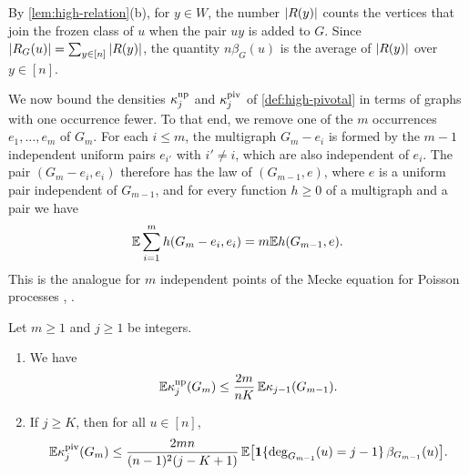 By \cref{lem:high-relation}(b), for $y \in W$, the number $\left|R(y)\right|$ counts the vertices that join the frozen class of $u$ when the pair $uy$ is added to $G$. Since $\left|R_G(u)\right| = \sum_{y \in [n]} \left|R(y)\right|$, the quantity $n \beta_G(u)$ is the average of $\left|R(y)\right|$ over $y \in [n]$.

We now bound the densities $\kappa_j^{\rm np}$ and $\kappa_j^{\rm piv}$ of \cref{def:high-pivotal} in terms of graphs with one occurrence fewer. To that end, we remove one of the $m$ occurrences $e_1, \dots, e_m$ of $G_m$. For each $i \le m$, the multigraph $G_m - e_i$ is formed by the $m - 1$ independent uniform pairs $e_{i'}$ with $i' \ne i$, which are also independent of $e_i$. The pair $(G_m - e_i, e_i)$ therefore has the law of $(G_{m - 1}, e)$, where $e$ is a uniform pair independent of $G_{m - 1}$, and for every function $h \ge 0$ of a multigraph and a pair we have
\begin{equation}\label{eq:high-exchange}
\mathbb E \sum_{i = 1}^m h(G_m - e_i, e_i) = m \mathbb E h(G_{m - 1}, e).
\end{equation}
This is the analogue for $m$ independent points of the Mecke equation for Poisson processes \cite{mecke1967stationare}, \cite[Theorem~4.1]{last2018lectures}.

\begin{lemma}\label{lem:high-deletion}
Let $m \ge 1$ and $j \ge 1$ be integers.
\begin{enumerate}[label=(\alph*)]
\item We have
\begin{equation}\label{eq:high-deletion-np}
\mathbb E \kappa_j^{\rm np}(G_m) \le \frac{2m}{nK} \, \mathbb E \kappa_{j - 1}(G_{m - 1}).
\end{equation}
\item If $j \ge K$, then for all $u \in [n]$,
\begin{equation}\label{eq:high-deletion-piv}
\mathbb E \kappa_j^{\rm piv}(G_m) \le \frac{2mn}{(n - 1)^2 (j - K + 1)} \, \mathbb E \bigl[ \mathbf 1 \{ \deg_{G_{m - 1}}(u) = j - 1 \} \, \beta_{G_{m - 1}}(u) \bigr].
\end{equation}
\end{enumerate}
\end{lemma}

